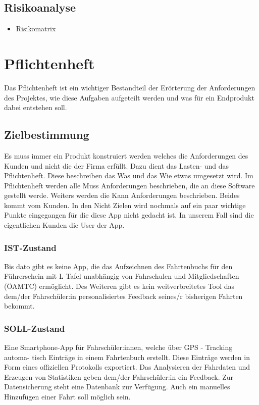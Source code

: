 \subsection{Risikoanalyse}

\begin{itemize}
	\item Risikomatrix
\end{itemize}

\newpage
\section{Pflichtenheft}

Das Pflichtenheft ist ein wichtiger Bestandteil der Erörterung der Anforderungen des Projektes, wie diese Aufgaben aufgeteilt werden und was für ein Endprodukt dabei entstehen soll.

\subsection{Zielbestimmung}
Es muss immer ein Produkt konstruiert werden welches die Anforderungen des Kunden und nicht die der Firma erfüllt. Dazu dient das Lasten- und das Pflichtenheft. Diese beschreiben das Was und das Wie etwas umgesetzt wird. Im Pflichtenheft werden alle Muss Anforderungen beschrieben, die an diese Software gestellt werde. Weiters werden die Kann Anforderungen beschrieben. Beides kommt vom Kunden. In den Nicht Zielen wird nochmals auf ein paar wichtige Punkte eingegangen für die diese App nicht gedacht ist. In unserem Fall sind die eigentlichen Kunden die User der App.

\subsubsection{IST-Zustand}
Bis dato gibt es keine App, die das Aufzeichnen des Fahrtenbuchs für den Führerschein mit L-Tafel unabhängig von Fahrschulen und Mitgliedschaften (ÖAMTC) ermöglicht. Des Weiteren gibt es kein weitverbreitetes Tool das dem/der Fahrschüler:in personalisiertes Feedback seines/r bisherigen Fahrten bekommt.

\subsubsection{SOLL-Zustand}
Eine Smartphone-App für Fahrschüler:innen, welche über GPS - Tracking automa-
tisch Einträge in einem Fahrtenbuch erstellt. Diese Einträge werden in Form eines
offiziellen Protokolls exportiert. Das Analysieren der Fahrdaten und Erzeugen von
Statistiken geben dem/der Fahrschüler:in ein Feedback. Zur Datensicherung steht
eine Datenbank zur Verfügung. Auch ein manuelles Hinzufügen einer Fahrt soll möglich sein.

